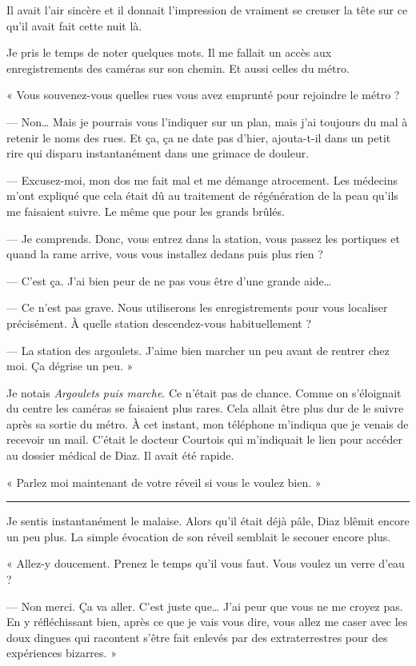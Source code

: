 Il avait l'air sincère et il donnait l'impression de vraiment se creuser la tête sur ce qu'il avait fait cette nuit là.

Je pris le temps de noter quelques mots. Il me fallait un accès aux enregistrements des caméras sur son chemin. Et
aussi celles du métro.

« Vous souvenez-vous quelles rues vous avez emprunté pour rejoindre le métro ?

— Non… Mais je pourrais vous l'indiquer sur un plan, mais j'ai toujours du mal à retenir le noms des rues. Et ça, ça ne 
date pas d'hier, ajouta-t-il dans un petit rire qui disparu instantanément dans une grimace de douleur.

— Excusez-moi, mon dos me fait mal et me démange atrocement. Les médecins m'ont expliqué que cela était dû au traitement 
de régénération de la peau qu'ils me faisaient suivre. Le même que pour les grands brûlés.

— Je comprends. Donc, vous entrez dans la station, vous passez les portiques et quand la rame arrive, vous vous 
installez dedans puis plus rien ?

— C'est ça. J'ai bien peur de ne pas vous être d'une grande aide…

— Ce n'est pas grave. Nous utiliserons les enregistrements pour vous localiser précisément. À quelle station
descendez-vous habituellement ?

— La station des argoulets. J'aime bien marcher un peu avant de rentrer chez moi. Ça dégrise un peu. »

Je notais \emph{Argoulets puis marche}. Ce n'était pas de chance. Comme on s'éloignait du centre les caméras se
faisaient plus rares. Cela allait être plus dur de le suivre après sa sortie du métro. À cet instant, mon téléphone
m'indiqua que je venais de recevoir un mail. C'était le docteur Courtois qui m'indiquait le lien pour accéder au dossier
médical de Diaz. Il avait été rapide.

« Parlez moi maintenant de votre réveil si vous le voulez bien. »

\fancybreak{$* * *$}

Je sentis instantanément le malaise. Alors qu'il était déjà pâle, Diaz blêmit encore un peu plus. La simple évocation 
de son réveil semblait le secouer encore plus.

« Allez-y doucement. Prenez le temps qu'il vous faut. Vous voulez un verre d'eau ?

— Non merci. Ça va aller. C'est juste que… J'ai peur que vous ne me croyez pas. En y réfléchissant bien, après ce que
je vais vous dire, vous allez me caser avec les doux dingues qui racontent s'être fait enlevés par des extraterrestres
pour des expériences bizarres. »

